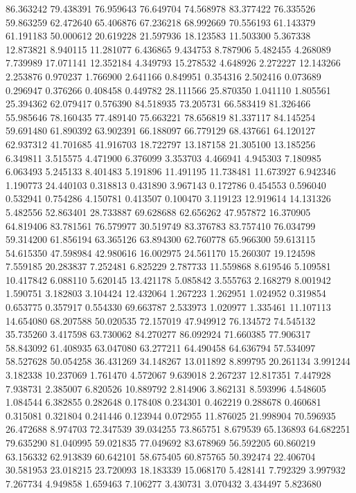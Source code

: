 86.363242
79.438391
76.959643
76.649704
74.568978
83.377422
76.335526
59.863259
62.472640
65.406876
67.236218
68.992669
70.556193
61.143379
61.191183
50.000612
20.619228
21.597936
18.123583
11.503300
5.367338
12.873821
8.940115
11.281077
6.436865
9.434753
8.787906
5.482455
4.268089
7.739989
17.071141
12.352184
4.349793
15.278532
4.648926
2.272227
12.143266
2.253876
0.970237
1.766900
2.641166
0.849951
0.354316
2.502416
0.073689
0.296947
0.376266
0.408458
0.449782
28.111566
25.870350
1.041110
1.805561
25.394362
62.079417
0.576390
84.518935
73.205731
66.583419
81.326466
55.985646
78.160435
77.489140
75.663221
78.656819
81.337117
84.145254
59.691480
61.890392
63.902391
66.188097
66.779129
68.437661
64.120127
62.937312
41.701685
41.916703
18.722797
13.187158
21.305100
13.185256
6.349811
3.515575
4.471900
6.376099
3.353703
4.466941
4.945303
7.180985
6.063493
5.245133
8.401483
5.191896
11.491195
11.738481
11.673927
6.942346
1.190773
24.440103
0.318813
0.431890
3.967143
0.172786
0.454553
0.596040
0.532941
0.754286
4.150781
0.413507
0.100470
3.119123
12.919614
14.131326
5.482556
52.863401
28.733887
69.628688
62.656262
47.957872
16.370905
64.819406
83.781561
76.579977
30.519749
83.376783
83.757410
76.034799
59.314200
61.856194
63.365126
63.894300
62.760778
65.966300
59.613115
54.615350
47.598984
42.980616
16.002975
24.561170
15.260307
19.124598
7.559185
20.283837
7.252481
6.825229
2.787733
11.559868
8.619546
5.109581
10.417842
6.088110
5.620145
13.421178
5.085842
3.555763
2.168279
8.001942
1.590751
3.182803
3.104424
12.432064
1.267223
1.262951
1.024952
0.319854
0.653775
0.357917
0.554330
69.663787
2.533973
1.020977
1.335461
11.107113
14.654080
68.207588
50.020535
72.157019
47.949912
76.134572
74.545132
35.735260
3.417598
63.730062
84.270277
86.092924
71.660385
77.906317
58.843092
61.408935
63.047080
63.277211
64.490458
64.636794
57.534097
58.527628
50.054258
36.431269
34.148267
13.011892
8.899795
20.261134
3.991244
3.182338
10.237069
1.761470
4.572067
9.639018
2.267237
12.817351
7.447928
7.938731
2.385007
6.820526
10.889792
2.814906
3.862131
8.593996
4.548605
1.084544
6.382855
0.282648
0.178408
0.234301
0.462219
0.288678
0.460681
0.315081
0.321804
0.241446
0.123944
0.072955
11.876025
21.998904
70.596935
26.472688
8.974703
72.347539
39.034255
73.865751
8.679539
65.136893
64.682251
79.635290
81.040995
59.021835
77.049692
83.678969
56.592205
60.860219
63.156332
62.913839
60.642101
58.675405
60.875765
50.392474
22.406704
30.581953
23.018215
23.720093
18.183339
15.068170
5.428141
7.792329
3.997932
7.267734
4.949858
1.659463
7.106277
3.430731
3.070432
3.434497
5.823680
